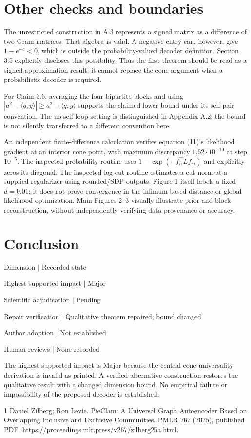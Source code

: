 \documentclass[10pt]{article}
\begin{document}
\section*{Other checks and boundaries}
The unrestricted construction in A.3 represents a signed matrix as a difference of two Gram matrices. That algebra is valid. A negative entry can, however, give \(1-e^{-c}<0\), which is outside the probability-valued decoder definition. Section 3.5 explicitly discloses this possibility. Thus the first theorem should be read as a signed approximation result; it cannot replace the cone argument when a probabilistic decoder is required.\par
For Claim 3.6, averaging the four bipartite blocks and using \(|a^2-\langle q,y\rangle|\ge a^2-\langle q,y\rangle\) supports the claimed lower bound under its self-pair convention. The no-self-loop setting is distinguished in Appendix A.2; the bound is not silently transferred to a different convention here.\par
An independent finite-difference calculation verifies equation (11)’s likelihood gradient at an interior cone point, with maximum discrepancy \(1.62\cdot10^{-10}\) at step \(10^{-5}\). The inspected probability routine uses \(1-\exp(-f_n^\top Lf_m)\) and explicitly zeros its diagonal. The inspected log-cut routine estimates a cut norm at a supplied regularizer using rounded/SDP outputs. Figure 1 itself labels a fixed \(d=0.01\); it does not prove convergence in the infimum-based distance or global likelihood optimization. Main Figures 2–3 visually illustrate prior and block reconstruction, without independently verifying data provenance or accuracy.\par
\section*{Conclusion}
Dimension | Recorded state\par
Highest supported impact | Major\par
Scientific adjudication | Pending\par
Repair verification | Qualitative theorem repaired; bound changed\par
Author adoption | Not established\par
Human reviews | None recorded\par
The highest supported impact is Major because the central cone-universality derivation is invalid as printed. A verified alternative construction restores the qualitative result with a changed dimension bound. No empirical failure or impossibility of the proposed decoder is established.\par
1 Daniel Zilberg; Ron Levie. PieClam: A Universal Graph Autoencoder Based on Overlapping Inclusive and Exclusive Communities. PMLR 267 (2025), published PDF. https://proceedings.mlr.press/v267/zilberg25a.html.\par
\end{document}
